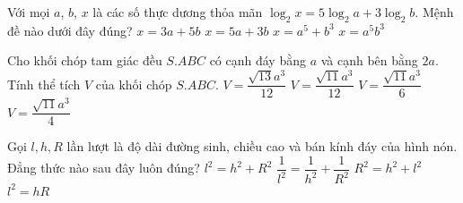 \begin{ex}%
	Với mọi $a$, $b$, $x$ là các số thực dương thỏa mãn $\log_2 x = 5\log_2 a + 3 \log_2 b$. Mệnh đề nào dưới đây đúng?
	\choice
	{$x= 3a + 5b$}
	{$x= 5a + 3b$}
	{$x= a^5 + b^3$}
	{\True $x= a^5 b^3$}
\end{ex}

\begin{ex}%
	Cho khối chóp tam giác đều $S.ABC$ có cạnh đáy bằng $a$ và cạnh bên bằng $2a$. Tính thể tích $V$ của khối chóp $S.ABC$.
	\choice
	{$V = \dfrac{\sqrt{13}a^3}{12}$}
	{\True $V = \dfrac{\sqrt{11}a^3}{12}$}
	{$V = \dfrac{\sqrt{11}a^3}{6}$}
	{$V = \dfrac{\sqrt{11}a^3}{4}$}
\end{ex}

\begin{ex}%
	Gọi $l,h,R$ lần lượt là độ dài đường sinh, chiều cao và bán kính đáy của hình nón. Đẳng thức nào sau đây luôn đúng?
	\choice
	{\True $l^2 = h^2 + R^2$}
	{$\dfrac{1}{l^2} = \dfrac{1}{h^2} + \dfrac{1}{R^2}$}
	{$R^2 = h^2 + l^2$}
	{$l^2 = hR$}
\loigiai{
}
\end{ex}

